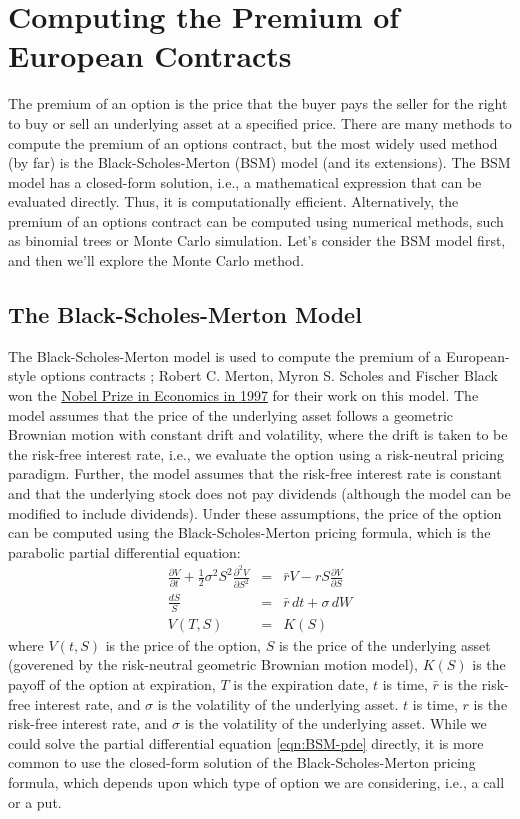 \documentclass[11pt]{article}
\theoremstyle{definition}
\begin{document}
\section*{Computing the Premium of European Contracts}
The premium of an option is the price that the buyer pays the seller for the right to buy or sell an underlying asset at a specified price.
There are many methods to compute the premium of an options contract, but the most widely used method (by far) is the Black-Scholes-Merton (BSM) model (and its extensions).
The BSM model has a closed-form solution, i.e., a mathematical expression that can be evaluated directly. Thus, it is computationally efficient.
Alternatively, the premium of an options contract can be computed using numerical methods, such as binomial trees or Monte Carlo simulation.
Let's consider the BSM model first, and then we'll explore the Monte Carlo method.

\subsection*{The Black-Scholes-Merton Model}
The Black-Scholes-Merton model is used to compute the premium of a European-style options contracts \cite{BlackScholes1973};
Robert C. Merton, Myron S. Scholes and Fischer Black won the \href{https://www.nobelprize.org/prizes/economic-sciences/1997/press-release/}{Nobel Prize in Economics in 1997} for their work on this model.
The model assumes that the price of the underlying asset follows a geometric Brownian motion with constant drift and volatility, where the drift is taken to be the risk-free interest rate, i.e., we evaluate the option using a risk-neutral pricing paradigm.
Further, the model assumes that the risk-free interest rate is constant and that the underlying stock does not pay dividends (although the model can be modified to include dividends).
Under these assumptions, the price of the option can be computed using the Black-Scholes-Merton pricing formula, which is the parabolic partial differential equation:
\begin{eqnarray}\label{eqn:BSM-pde}
	\frac{\partial{V}}{\partial{t}} + \frac{1}{2}\sigma^{2}S^{2}\frac{\partial^{2}V}{\partial{S}^{2}} & = & \bar{r}V - rS\frac{\partial{V}}{\partial{S}}  \\
	\frac{dS}{S} & = & \bar{r}\,dt + \sigma\,{dW}\\
	V(T,S) & = & K(S)
\end{eqnarray}
where $V(t,S)$ is the price of the option, $S$ is the price of the underlying asset (goverened by the risk-neutral geometric Brownian motion model), 
$K(S)$ is the payoff of the option at expiration, $T$ is the expiration date, $t$ is time, 
$\bar{r}$ is the risk-free interest rate, and $\sigma$ is the volatility of the underlying asset.
$t$ is time, $r$ is the risk-free interest rate, and $\sigma$ is the volatility of the underlying asset.
While we could solve the partial differential equation \ref{eqn:BSM-pde} directly, it is more common to use the closed-form solution of the Black-Scholes-Merton pricing formula, 
which depends upon which type of option we are considering, i.e., a call or a put.
\end{document}
